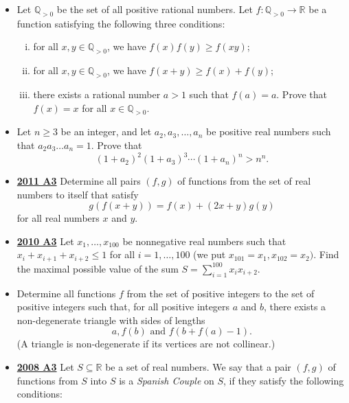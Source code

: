 \documentclass[11pt]{scrartcl}
\begin{document}
\begin{itemize}[leftmargin=*]
Find the least possible constant $c$ such that for every positive integer $n$, for every collection of $n$ real numbers, and for every possible sequence that George might obtain, the resulting values satisfy the inequality $G\leqslant cD$.
\newpage
\item {} Let $\mathbb Q_{>0}$ be the set of all positive rational numbers. Let $f:\mathbb Q_{>0}\to\mathbb R$ be a function satisfying the following three conditions: 
\begin{enumerate}[(i)]
    \item for all $x,y\in\mathbb Q_{>0}$, we have $f(x)f(y)\geqslant  f(xy)$; 
    \item for all $x,y\in\mathbb Q_{>0}$, we have $f(x+y)\geqslant  f(x)+f(y)$; 
    \item there exists a rational number $a>1$ such that $f(a)=a$.
Prove that $f(x)=x$ for all $x\in\mathbb Q_{>0}$.
\end{enumerate}
\item {}  Let $n\geqslant 3$ be an integer, and let $a_2,a_3,\dots ,a_n$ be positive real numbers such that $a_{2}a_{3}\dots a_{n}=1$. Prove that
\[(1 + a_2)^2 (1 + a_3)^3 \dotsm (1 + a_n)^n > n^n.\]
\item \href{https://artofproblemsolving.com/community/c6h488535p2737643}{\textbf{2011 A3}} Determine all pairs $(f,g)$ of functions from the set of real numbers to itself that satisfy\[g(f(x+y)) = f(x) + (2x + y)g(y)\]for all real numbers $x$ and $y$.
\item \href{https://artofproblemsolving.com/community/c6h418680p2362280}{\textbf{2010 A3}} Let $x_1, \dots , x_{100}$ be nonnegative real numbers such that $x_i + x_{i+1} + x_{i+2} \leqslant 1$ for all $i = 1, \dots , 100$ (we put $x_{101 } = x_1, x_{102} = x_2).$ Find the maximal possible value of the sum $S = \displaystyle{\sum^{100}_{i=1} x_i x_{i+2}.}$
\item {} Determine all functions $ f$ from the set of positive integers to the set of positive integers such that, for all positive integers $ a$ and $ b$, there exists a non-degenerate triangle with sides of lengths
\[ a, f(b) \text{ and } f(b + f(a) - 1).\]
(A triangle is non-degenerate if its vertices are not collinear.)
\item \href{https://artofproblemsolving.com/community/c6h287852p1555894}{\textbf{2008 A3}} 	Let $ S\subseteq\mathbb{R}$ be a set of real numbers. We say that a pair $ (f, g)$ of functions from $ S$ into $ S$ is a \textit{Spanish Couple} on $ S$, if they satisfy the following conditions: 

\end{itemize}
\end{document}

